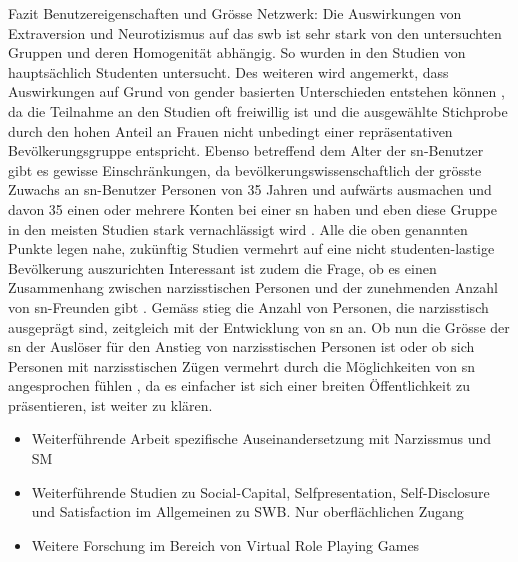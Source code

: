 Fazit Benutzereigenschaften und Grösse Netzwerk:\newline
Die Auswirkungen von Extraversion und Neurotizismus auf das \gls{swb} ist sehr stark von den untersuchten Gruppen und deren Homogenität abhängig. So wurden in den Studien von  hauptsächlich Studenten untersucht. Des weiteren wird angemerkt, dass Auswirkungen auf Grund von gender basierten Unterschieden entstehen können \cite{Special:2012}, da die Teilnahme an den Studien oft freiwillig ist und die ausgewählte Stichprobe durch den hohen Anteil an Frauen \cite{Manago:2012} nicht unbedingt einer repräsentativen Bevölkerungsgruppe entspricht. Ebenso betreffend dem Alter der \gls{sn}-Benutzer gibt es gewisse Einschränkungen, da bevölkerungswissenschaftlich der grösste Zuwachs an \gls{sn}-Benutzer Personen von 35 Jahren und aufwärts ausmachen \cite{Lenhart:2009} und davon 35\text{\%}  einen oder mehrere Konten bei einer \gls{sn} haben und eben diese Gruppe in den meisten Studien stark vernachlässigt wird \cite{Special:2012}. Alle die oben genannten Punkte legen nahe, zukünftig Studien vermehrt auf eine nicht studenten-lastige Bevölkerung auszurichten \cite{Kim:2011} \newline
Interessant ist zudem die Frage, ob es einen Zusammenhang zwischen narzisstischen Personen und der zunehmenden Anzahl von \gls{sn}-Freunden gibt \cite{Manago:2012}. Gemäss  stieg die Anzahl von Personen, die narzisstisch ausgeprägt sind, zeitgleich mit der Entwicklung von \gls{sn} an. Ob nun die Grösse der \gls{sn} der Auslöser für den Anstieg von narzisstischen Personen ist \cite{Manago:2012} oder ob sich Personen mit narzisstischen Zügen vermehrt durch die Möglichkeiten von \gls{sn} angesprochen fühlen \cite{Carpenter:2012}, da es einfacher ist sich einer breiten Öffentlichkeit zu präsentieren, ist weiter zu klären. 

\begin{itemize}
\item Weiterführende Arbeit spezifische Auseinandersetzung mit Narzissmus und SM
\item Weiterführende Studien zu Social-Capital, Selfpresentation, Self-Disclosure und Satisfaction im Allgemeinen zu SWB. Nur oberflächlichen Zugang
\item Weitere Forschung im Bereich von Virtual Role Playing Games
\end{itemize}
